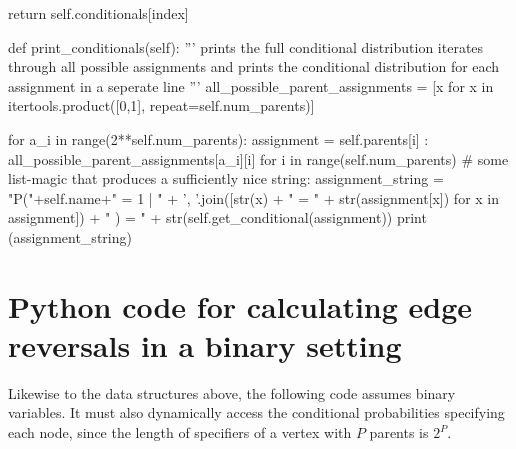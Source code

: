 \begin{python}
        return self.conditionals[index]

    
    def print_conditionals(self):
        '''
        prints the full conditional distribution
        iterates through all possible assignments and prints the conditional distribution for each assignment in a seperate line
        '''
        all_possible_parent_assignments = [x for x in itertools.product([0,1], repeat=self.num_parents)]

        for a_i in range(2**self.num_parents):
            assignment = {self.parents[i] : all_possible_parent_assignments[a_i][i] for i in range(self.num_parents)}
            # some list-magic that produces a sufficiently nice string:
            assignment_string = "P("+self.name+" = 1 | " + ', '.join([str(x) 
            		+ " = " + str(assignment[x]) for x in assignment]) + " ) 
            		= " + str(self.get_conditional(assignment))
            print (assignment_string)
\end{python}

\section*{Python code for calculating edge reversals in a binary setting}

Likewise to the data structures above, the following code assumes binary variables. It must also dynamically access the conditional probabilities specifying each node, since the length of specifiers of a vertex with $P$ parents is $2^{P}$. 

